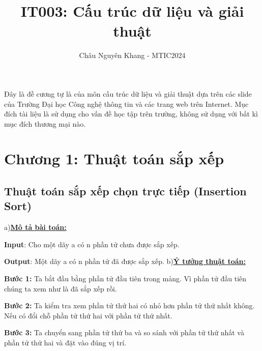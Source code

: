 \documentclass[12pt]{article}
\title{IT003: Cấu trúc dữ liệu và giải thuật}
\author{Châu Nguyên Khang - MTIC2024}
\begin{document}
\maketitle
\par
Đây là đề cương tự là của môn cấu trúc dữ liệu và giải thuật dựa trên các slide của 
Trường Đại học Công nghệ thông tin và các trang web trên Internet. Mục đích tài liệu là sử dụng cho vấn đề học tập 
trên trường, không sử dụng với bất kì mục đích thương mại nào.
\newpage
\section{Chương 1: Thuật toán sắp xếp}
\subsection{Thuật toán sắp xếp chọn trực tiếp (Insertion Sort)}
\begingroup
    a)\textbf{\underline{Mô tả bài toán:}}
    
    \textbf{Input}: Cho một dãy a có n phần tử chưa được sắp xếp.

    \textbf{Output}: Một dãy a có n phần tử đã được sắp xếp.
    \newline
\endgroup
\begingroup
    b)\textbf{\underline{Ý tưởng thuật toán:}}

    \textbf{Bước 1:} Ta bắt đầu bằng phần tử đầu tiên trong mảng. Vì phần tử đầu tiên
    chúng ta xem như là đã sắp xếp rồi.

    \textbf{Bước 2:} Ta kiểm tra xem phần tử thứ hai có nhỏ hơn phần tử thứ nhất không.
    Nếu có đổi chỗ phần tử thứ hai với phần tử thứ nhất.

    \textbf{Bước 3:} Ta chuyển sang phần tử thứ ba và so sánh với phần tử thứ nhất và
    phần tử thứ hai và đặt vào đúng vị trí.
\end{document}
